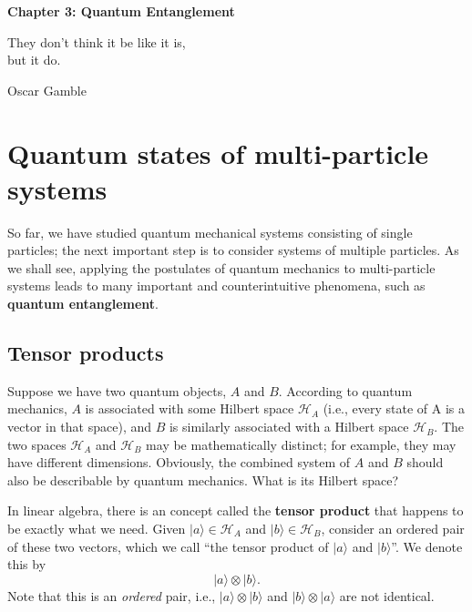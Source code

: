 \documentclass[pra,12pt]{revtex4-2}
\begin{document}
\setcounter{page}{36}

\begin{center}
{\Large \textbf{Chapter 3: Quantum Entanglement}}
\end{center}

\epigraph{They don't think it be like it is, \\but it do.}{Oscar Gamble}

\section{Quantum states of multi-particle systems}

So far, we have studied quantum mechanical systems consisting of
single particles; the next important step is to consider systems of
multiple particles.  As we shall see, applying the postulates of
quantum mechanics to multi-particle systems leads to many important
and counterintuitive phenomena, such as \textbf{quantum entanglement}.

\subsection{Tensor products}
\label{sec:tensorprod}

Suppose we have two quantum objects, $A$ and $B$.  According to
quantum mechanics, $A$ is associated with some Hilbert space
$\mathscr{H}_A$ (i.e., every state of A is a vector in that space),
and $B$ is similarly associated with a Hilbert space $\mathscr{H}_B$.
The two spaces $\mathscr{H}_A$ and $\mathscr{H}_B$ may be
mathematically distinct; for example, they may have different
dimensions.  Obviously, the combined system of $A$ and $B$ should also
be describable by quantum mechanics.  What is its Hilbert space?

In linear algebra, there is an concept called the \textbf{tensor
  product} that happens to be exactly what we need.  Given $|a\rangle
\in \mathscr{H}_A$ and $|b\rangle \in \mathscr{H}_B$, consider an
ordered pair of these two vectors, which we call ``the tensor product
of $|a\rangle$ and $|b\rangle$''.  We denote this by
\begin{equation*}
  |a\rangle \otimes |b\rangle.
\end{equation*}
Note that this is an \textit{ordered} pair, i.e.,
$|a\rangle\otimes|b\rangle$ and $|b\rangle\otimes|a\rangle$ are not
identical.
\end{document}
